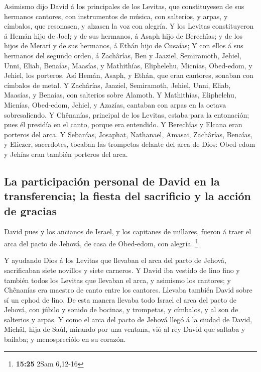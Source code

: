  Asimismo dijo David á los principales de los Levitas, que
constituyesen de sus hermanos cantores, con instrumentos de música, con
salterios, y arpas, y címbalos, que resonasen, y alzasen la voz con
alegría.  Y los Levitas constituyeron á Hemán hijo de Joel;
y de sus hermanos, á Asaph hijo de Berechîas; y de los hijos de Merari y
de sus hermanos, á Ethán hijo de Cusaías;  Y con ellos á
sus hermanos del segundo orden, á Zachârías, Ben y Jaaziel, Semiramoth,
Jehiel, Unni, Eliab, Benaías, Maasías, y Mathithías, Eliphelehu,
Micnías, Obed-edom, y Jehiel, los porteros.  Así Hemán,
Asaph, y Ethán, que eran cantores, sonaban con címbalos de metal.
 Y Zachârías, Jaaziel, Semiramoth, Jehiel, Unni, Eliab,
Maasías, y Benaías, con salterios sobre Alamoth.  Y
Mathithías, Eliphelehu, Micnías, Obed-edom, Jehiel, y Azazías, cantaban
con arpas en la octava sobresaliendo.  Y Chênanías,
principal de los Levitas, estaba para la entonación; pues él presidía en
el canto, porque era entendido.  Y Berechîas y Elcana eran
porteros del arca.  Y Sebanías, Josaphat, Nathanael,
Amasai, Zachârías, Benaías, y Eliezer, sacerdotes, tocaban las trompetas
delante del arca de Dios: Obed-edom y Jehías eran también porteros del
arca.

\hypertarget{la-participaciuxf3n-personal-de-david-en-la-transferencia-la-fiesta-del-sacrificio-y-la-acciuxf3n-de-gracias}{%
\subsection{La participación personal de David en la transferencia; la
fiesta del sacrificio y la acción de
gracias}\label{la-participaciuxf3n-personal-de-david-en-la-transferencia-la-fiesta-del-sacrificio-y-la-acciuxf3n-de-gracias}}

 David pues y los ancianos de Israel, y los capitanes de
millares, fueron á traer el arca del pacto de Jehová, de casa de
Obed-edom, con alegría. \footnote{\textbf{15:25} 2Sam 6,12-16}

 Y ayudando Dios á los Levitas que llevaban el arca del
pacto de Jehová, sacrificaban siete novillos y siete carneros.
 Y David iba vestido de lino fino y también todos los
Levitas que llevaban el arca, y asimismo los cantores; y Chênanías era
maestro de canto entre los cantores. Llevaba también David sobre sí un
ephod de lino.  De esta manera llevaba todo Israel el arca
del pacto de Jehová, con júbilo y sonido de bocinas, y trompetas, y
címbalos, y al son de salterios y arpas.  Y como el arca
del pacto de Jehová llegó á la ciudad de David, Michâl, hija de Saúl,
mirando por una ventana, vió al rey David que saltaba y bailaba; y
menospreciólo en su corazón.

